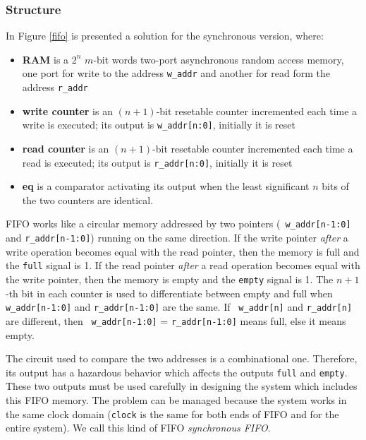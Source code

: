 \subsubsection{Structure}

In Figure \ref{fifo} is presented a solution for the synchronous
version, where:


\begin{itemize}
    \item {\bf RAM} is a $2^{n}$ $m$-bit words two-port asynchronous random access memory, one
    port for write to the address {\tt w\_addr} and another for
    read form the address {\tt r\_addr}
    \item {\bf write counter} is an $(n+1)$-bit resetable counter incremented
    each time a write is executed; its output is {\tt w\_addr[n:0]}, initially
    it is reset
    \item {\bf read counter} is an $(n+1)$-bit resetable counter incremented
    each time a read is executed; its output is {\tt r\_addr[n:0]}, initially it is reset
    \item {\bf eq} is a comparator activating its output when
    the least significant $n$ bits of the two counters are
    identical.
\end{itemize}

FIFO works like a circular memory addressed by two pointers ({\tt
w\_addr[n-1:0]} and {\tt r\_addr[n-1:0]}) running on the same
direction. If the write pointer {\em after} a write operation
becomes equal with the read pointer, then the memory is  full and
the {\tt full} signal is 1. If the read pointer {\em after} a read
operation becomes equal with the write pointer, then the memory is
empty and the {\tt empty} signal is 1. The $n+1$-th bit in each
counter is used to differentiate between empty and full when {\tt
w\_addr[n-1:0]} and {\tt r\_addr[n-1:0]} are the same. If {\tt
w\_addr[n]} and {\tt r\_addr[n]} are different, then {\tt
w\_addr[n-1:0]} = {\tt r\_addr[n-1:0]} means full, else it means
empty.

The circuit used to compare the two addresses is a combinational
one. Therefore, its output has a hazardous behavior which affects
the outputs {\tt full} and {\tt empty}. These two outputs must be
used carefully in designing the system which includes this FIFO
memory. The problem can be managed because the system works in the
same clock domain ({\tt clock} is the same for both ends of FIFO
and for the entire system). We call this kind of FIFO {\em
synchronous FIFO}.


